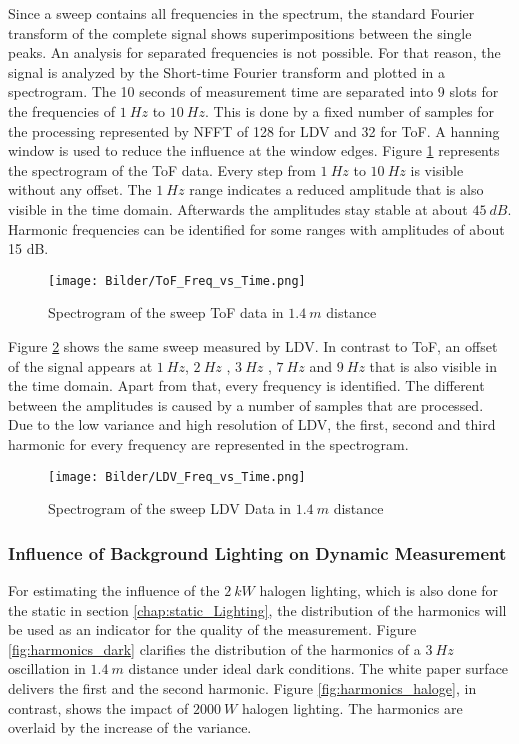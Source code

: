 \newpage
Since a sweep contains all frequencies in the spectrum, the standard Fourier transform of the complete signal shows superimpositions between the single peaks. An analysis for separated frequencies is not possible. For that reason, the signal is analyzed by the Short-time Fourier transform and plotted in a spectrogram. The 10 seconds of measurement time are separated into 9 slots for the frequencies of $1~Hz$ to $10~Hz$. This is done by a fixed number of samples for the processing represented by NFFT of 128 for LDV and 32 for ToF. A hanning window is used to reduce the influence at the window edges. Figure \ref{fig:spectogram_Variable_displacement_ToF} represents the spectrogram of the ToF data. Every step from $1~Hz$ to $10~Hz$ is visible without any offset. The $1~Hz$ range indicates a reduced amplitude that is also visible in the time domain. Afterwards the amplitudes stay stable at about $45~dB$. Harmonic frequencies can be identified for some ranges with amplitudes of about 15 dB. 

\begin{figure}[!h]  
	\centering
	\texttt{[image: Bilder/ToF\_Freq\_vs\_Time.png]}
	\caption{Spectrogram of the sweep ToF data in $1.4~m$ distance}
	\label{fig:spectogram_Variable_displacement_ToF} 
\end{figure}

Figure \ref{fig:spectogram_Variable_displacement_LDV} shows the same sweep measured by LDV. In contrast to ToF, an offset of the signal appears at $1~Hz$, $2~Hz$ , $3~Hz$ , $7~Hz$ and $9~Hz$ that is also visible in the time domain. Apart from that, every frequency is identified. The different between the amplitudes is caused by a number of samples that are processed. Due to the low variance and high resolution of LDV, the first, second and third harmonic for every frequency are represented in the spectrogram. 

\begin{figure}[!h]  
	\centering
	\texttt{[image: Bilder/LDV\_Freq\_vs\_Time.png]}
	\caption{Spectrogram of the sweep LDV Data in $1.4~m$ distance}
	\label{fig:spectogram_Variable_displacement_LDV}
\end{figure}  
 
\newpage
\subsubsection{Influence of Background Lighting on Dynamic Measurement}
For estimating the influence of the $2~kW$ halogen lighting, which is also done for the static in section \ref{chap:static_Lighting}, the distribution of the harmonics will be used as an indicator for the quality of the measurement. Figure \ref{fig:harmonics_dark} clarifies the distribution of the harmonics of a $3~Hz$ oscillation in $1.4~m$ distance under ideal dark conditions. The white paper surface delivers the first and the second harmonic. Figure \ref{fig:harmonics_haloge}, in contrast, shows the impact of $2000~W$ halogen lighting. The harmonics are overlaid by the increase of the variance.  

